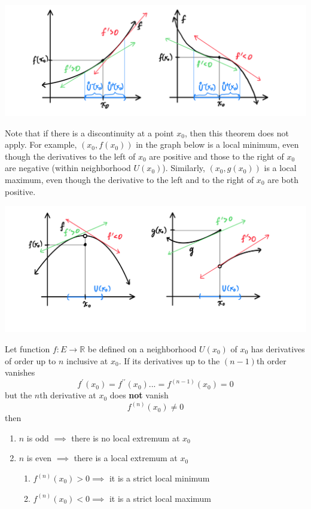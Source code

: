 \begin{theorem}
\begin{enumerate}
      \begin{center}
          \includegraphics[scale=0.25]{img/No_Extremum.PNG}
      \end{center}
    \end{enumerate}
    \end{theorem}

    Note that if there is a discontinuity at a point $x_0$, then this theorem does not apply. For example, $(x_0, f(x_0))$ in the graph below is a local minimum, even though the derivatives to the left of $x_0$ are positive and those to the right of $x_0$ are negative (within neighborhood $U(x_0)$). Similarly, $(x_0, g(x_0))$ is a local maximum, even though the derivative to the left and to the right of $x_0$ are both positive. 
    \begin{center}
        \includegraphics[scale=0.3]{img/Theorem_not_apply_if_Discontinuity.PNG}
    \end{center}

    \begin{proposition}
    Let function $f: E \longrightarrow \mathbb{R}$ be defined on a neighborhood $U(x_0)$ of $x_0$ has derivatives of order up to $n$ inclusive at $x_0$. If its derivatives up to the $(n-1)$th order vanishes 
    \[f^\prime (x_0) = f^{\prime\prime} (x_0) ... = f^{(n-1)} (x_0) = 0\]
    but the $n$th derivative at $x_0$ does \textbf{not} vanish
    \[f^{(n)} (x_0) \neq 0\]
    then 
    \begin{enumerate}
      \item $n$ is odd $\implies$ there is no local extremum at $x_0$ 
      \item $n$ is even $\implies$ there is a local extremum at $x_0$
      \begin{enumerate}
        \item $f^{(n)} (x_0) > 0 \implies$ it is a strict local minimum
        \item $f^{(n)} (x_0) < 0 \implies$ it is a strict local maximum
      \end{enumerate}
    \end{enumerate}
    \end{proposition}


